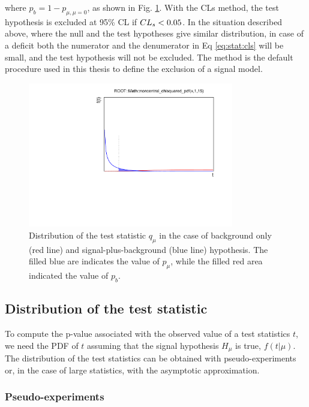 \noindent where $p_b = 1 - p_{\mu, \mu=0}$, as shown in Fig. \ref{fig:stat:pmu_pb}. With the CLs method, the test hypothesis is excluded at 95\% CL if $CL_s < 0.05$. In the situation described above, where the null and the test hypotheses give similar \qmu distribution, in case of a deficit both the numerator and the denumerator in Eq \ref{eq:stat:cls} will be small, and the test hypothesis will not be excluded. The \cls method is the default procedure used in this thesis to define the exclusion of a signal model. 


\begin{figure}
\centering
\includegraphics[width=0.8\textwidth]{produce_plots/stat/pmu_pb.pdf}
\caption{Distribution of the test statistic $q_\mu$ in the case of background only (red line) and signal-plus-background (blue line) hypothesis. The filled blue are indicates the value of $p_\mu$, while the filled red area indicated the value of $p_b$.}
\label{fig:stat:pmu_pb}
\end{figure}

\subsection{Distribution of the test statistic}

To compute the p-value associated with the observed value of a test statistics $t$, we need the PDF of $t$ assuming that the signal hypothesis $H_\mu$ is true, $ f(t | \mu ) $. The distribution of the test statistics can be obtained with pseudo-experiments or, in the case of large statistics, with the asymptotic approximation. 

\subsubsection*{Pseudo-experiments}


